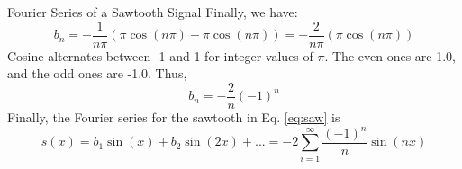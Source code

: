 \documentclass{beamer}
\begin{document}
\begin{frame}{Fourier Series of a Sawtooth Signal}
\small
Finally, we have:
\begin{equation}
b_n = -\frac{1}{n\pi}\left(\pi\cos(n\pi)+\pi\cos(n\pi) \right) = -\frac{2}{n\pi}\left(\pi\cos(n\pi)\right)
\end{equation}
Cosine alternates between -1 and 1 for integer values of $\pi$.  The even ones are 1.0, and the odd ones are -1.0.  Thus,
\begin{equation}
b_n = -\frac{2}{n}(-1)^n
\end{equation}
Finally, the Fourier series for the sawtooth in Eq. \ref{eq:saw} is
\begin{equation}
s(x) = b_1 \sin(x) + b_2\sin(2x) + ... = -2 \sum_{i=1}^{\infty} \frac{(-1)^n}{n} \sin(nx)
\end{equation}
\end{frame}
\end{document}
